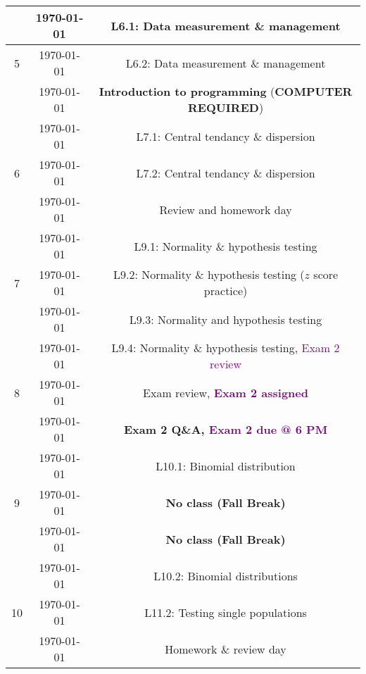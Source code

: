 \documentclass[11pt]{article}
\begin{document}
{\begin{center}
\begin{longtable}{| c | c | c |}
			& \printyearoff\AdvanceDate[\fpeval{(7*3)+4}]\today & L6.1: Data measurement \& management \\
			\hline
			5 & \printyearoff\AdvanceDate[\fpeval{(7*4)+0}]\today & L6.2: Data measurement \& management \\
			& \printyearoff\AdvanceDate[\fpeval{(7*4)+2}]\today & \textbf{Introduction to programming} (\textbf{COMPUTER REQUIRED}) \\
			& \printyearoff\AdvanceDate[\fpeval{(7*4)+4}]\today & L7.1: Central tendancy \& dispersion \\
			\hline
			6 & \printyearoff\AdvanceDate[\fpeval{(7*5)+0}]\today & L7.2: Central tendancy \& dispersion \\
			& \printyearoff\AdvanceDate[\fpeval{(7*5)+2}]\today & Review and homework day \\
			& \printyearoff\AdvanceDate[\fpeval{(7*5)+4}]\today & L9.1: Normality \& hypothesis testing\\
			\hline
			7 & \printyearoff\AdvanceDate[\fpeval{(7*6)+0}]\today & L9.2: Normality \& hypothesis testing ($z$ score practice)  \\
			& \printyearoff\AdvanceDate[\fpeval{(7*6)+2}]\today & L9.3: Normality and hypothesis testing \\
			& \printyearoff\AdvanceDate[\fpeval{(7*6)+4}]\today & L9.4: Normality \& hypothesis testing, \textcolor{purple}{Exam 2 review} \\
			\hline
			8 & \printyearoff\AdvanceDate[\fpeval{(7*7)+0}]\today & Exam review, \textcolor{purple}{\textbf{Exam 2 assigned}}  \\
			& \printyearoff\AdvanceDate[\fpeval{(7*7)+2}]\today & \textbf{Exam 2 Q\&A, \textcolor{purple}{Exam 2 due @ 6 PM}} \\
			& \printyearoff\AdvanceDate[\fpeval{(7*7)+4}]\today & L10.1: Binomial distribution \\
			\hline
			9 & \printyearoff\AdvanceDate[\fpeval{(7*8)+0}]\today & \textbf{No class (Fall Break)}  \\
			& \printyearoff\AdvanceDate[\fpeval{(7*8)+2}]\today & \textbf{No class (Fall Break)} \\
			& \printyearoff\AdvanceDate[\fpeval{(7*8)+4}]\today & L10.2: Binomial distributions \\
			\hline
			10 & \printyearoff\AdvanceDate[\fpeval{(7*9)+0}]\today & L11.2: Testing single populations  \\
			& \printyearoff\AdvanceDate[\fpeval{(7*9)+2}]\today & Homework \& review day \\

\end{longtable}
\end{center}}
\end{document}
